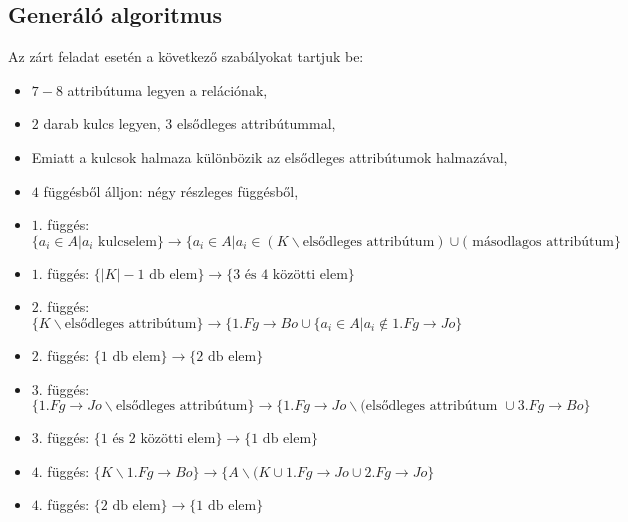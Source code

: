 \subsection{Generáló algoritmus}
Az zárt feladat esetén a következő szabályokat tartjuk be:
\begin{itemize}
    \item $7-8$ attribútuma legyen a relációnak,
    \item $2$ darab kulcs legyen, $3$ elsődleges attribútummal, 
    \item Emiatt a kulcsok halmaza különbözik az elsődleges attribútumok halmazával,
    \item $4$ függésből álljon: négy részleges függésből,
    \item $1.$ függés: $\big\{ a_i \in A \big| a_i \text{ kulcselem}  \big\} \longrightarrow \big\{  a_i \in A \big| a_i \in (K \backslash \text{elsődleges attribútum}) \cup (\text{ másodlagos attribútum}   \big\}$ 
    \item $1.$ függés: $\big \{ |K|-1 \text{ db elem} \big\} \longrightarrow \big\{ 3 \text{ és } 4 \text{ közötti elem} \big \}$
    \item $2.$ függés: $\big\{ K \backslash \text{elsődleges attribútum} \big\} \longrightarrow \big\{ 1.Fg \rightarrow Bo \cup \{ a_i \in A \big| a_i \not \in 1.Fg \rightarrow Jo  \big\}$ 
    \item $2.$ függés: $\big \{ 1 \text{ db elem} \big\} \longrightarrow \big\{ 2 \text{ db elem} \big \}$
    \item $3.$ függés: $\big\{  1.Fg \rightarrow Jo \backslash \text{elsődleges attribútum} \big\} \longrightarrow \big\{ 1.Fg \rightarrow Jo \backslash (\text{elsődleges attribútum } \cup 3.Fg \rightarrow Bo  \big \}$
    \item $3.$ függés: $\big \{ 1 \text{ és } 2 \text{ közötti elem} \big\} \longrightarrow \big\{1 \text{ db elem} \big \}$
    \item $4.$ függés: $\big\{ K \backslash 1.Fg \rightarrow Bo \big\} \longrightarrow \big\{ A \backslash (K \cup 1.Fg \rightarrow Jo \cup 2.Fg \rightarrow Jo  \big \}$
    \item $4.$ függés: $\big \{ 2 \text{ db elem} \big\} \longrightarrow \big\{1 \text{ db elem} \big \}$
\end{itemize}


